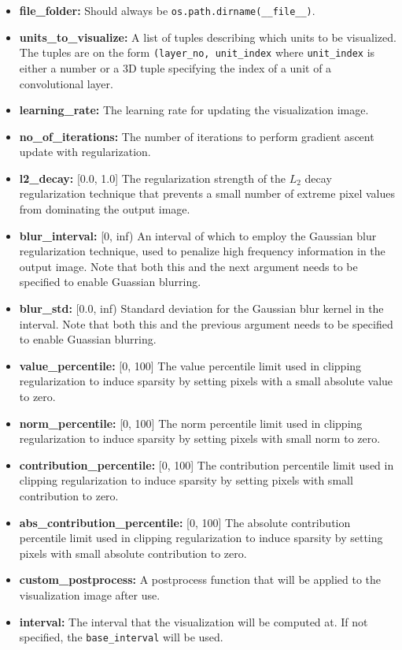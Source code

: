 \begin{itemize}
    \item \textbf{file\_folder:} Should always be \texttt{os.path.dirname(\_\_file\_\_)}.
    \item \textbf{units\_to\_visualize:} A list of tuples describing which units to be visualized. The tuples are on the form \texttt{(layer\_no, unit\_index} where \texttt{unit\_index} is either a number or a 3D tuple specifying the index of a unit of a convolutional layer.
    \item \textbf{learning\_rate:} The learning rate for updating the visualization image.
    \item \textbf{no\_of\_iterations:} The number of iterations to perform gradient ascent update with regularization.
    \item \textbf{l2\_decay:} [0.0, 1.0] The regularization strength of the $L_2$ decay regularization technique that prevents a small number of extreme pixel values from dominating the output image.
    \item \textbf{blur\_interval:} [0, inf) An interval of which to employ the Gaussian blur regularization technique, used to penalize high frequency information in the output image. Note that both this and the next argument needs to be specified to enable Guassian blurring.
    \item \textbf{blur\_std:} [0.0, inf) Standard deviation for the Gaussian blur kernel in the interval. Note that both this and the previous argument needs to be specified to enable Guassian blurring.
    \item \textbf{value\_percentile:} [0, 100] The value percentile limit used in clipping regularization to induce sparsity by setting pixels with a small absolute value to zero.
    \item \textbf{norm\_percentile:} [0, 100] The norm percentile limit used in clipping regularization to induce sparsity by setting pixels with small norm to zero.
    \item \textbf{contribution\_percentile:} [0, 100] The contribution percentile limit used in clipping regularization to induce sparsity by setting pixels with small contribution to zero.
    \item \textbf{abs\_contribution\_percentile:} [0, 100] The absolute contribution percentile limit used in clipping regularization to induce sparsity by setting pixels with small absolute contribution to zero.
    \item \textbf{custom\_postprocess:} A postprocess function that will be applied to the visualization image after use.
    \item \textbf{interval:} The interval that the visualization will be computed at. If not specified, the \texttt{base\_interval} will be used.
\end{itemize}

\cleardoublepage